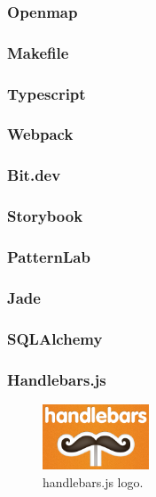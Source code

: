 \subsubsection{Openmap}
\subsubsection{Makefile}
\subsubsection{Typescript}
\subsubsection{Webpack}
\subsubsection{Bit.dev}
\subsubsection{Storybook}
\subsubsection{PatternLab}
\subsubsection{Jade}
\subsubsection{SQLAlchemy}

\subsubsection{Handlebars.js}

\begin{figure}
\center
\includegraphics[keepaspectratio, width=120px]{images/handlebarsjs.png}
\caption{handlebars.js logo.}
\end{figure}

